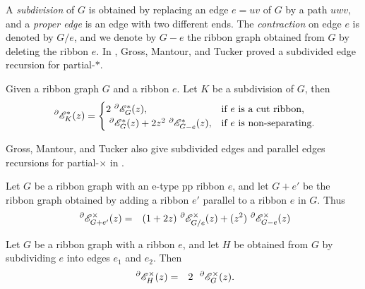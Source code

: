 { A \textit{subdivision} of  $G$ is obtained by replacing an  edge $e=uv$ of $G$ by a path $uwv,$ and  a \textit{proper edge} is  an edge with two  different ends.
 The \textit{contraction} on edge $e$ is denoted  by $G/e$, and we denote by $G-e$ the ribbon graph obtained from
$G$ by deleting the ribbon $e$.
  In \cite{GMT20}, Gross, Mantour, and Tucker proved a subdivided edge recursion for partial-$*$.}
\begin{thm} \cite{GMT20}\label{GMT20}
Given a ribbon graph $G$ and a ribbon $e$. Let $K$ be a subdivision of $G$,
then\begin{equation}\label{1027}
~^{\partial}{{\mathscr{E}}}^{*}_{K}(z)=
\begin{cases}
 2~^{\partial}{{\mathscr{E}}}^{*}_{G}(z),&\text{if $e$ is a cut ribbon,  }\\
  ~^{\partial}{{\mathscr{E}}}^{*}_{G}(z)+2z^{2}~^{\partial}{{\mathscr{E}}}^{*}_{G-e}(z),&\text{if $e$ is non-separating.}\\
\end{cases}
\end{equation}
\end{thm}

Gross, Mantour, and Tucker also give  subdivided edges and parallel  edges recursions for partial-$\times$ in \cite{GMT21a}.

\begin{thm}\cite{GMT21a}
Let $G$ be a ribbon graph with an e-type pp ribbon $e$, and let  $G+e'$ be the ribbon graph   obtained  by adding a ribbon $e'$ parallel to a ribbon $e$ in $G$.  Thus
\begin{eqnarray}
~^{\partial}{{\mathscr{E}}}^{\times}_{G+e'}(z) &=&(1+2z) ~^{\partial}{{\mathscr{E}}}^{\times}_{G/e}(z)+(z^{2})~^{\partial}{{\mathscr{E}}}^{\times}_{G-e}(z)
\end{eqnarray}
\end{thm}



\begin{thm}\cite{GMT21a}\label{sub}
Let $G$ be a ribbon graph with a ribbon $e$, and let  $H$ be  obtained  from $G $ by subdividing  $e$ into edges $e_{1}$ and $e_{2}$. Then
\begin{eqnarray}
~^{\partial}{{\mathscr{E}}}^{\times}_{H}(z) &=&2~ ~^{\partial}{{\mathscr{E}}}^{\times}_{G}(z).\label{sub0}
\end{eqnarray}
\end{thm}





